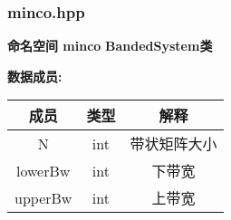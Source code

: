 \subsubsection{minco.hpp}
\textbf{命名空间 minco}
\textbf{BandedSystem类}
\begin{tcolorbox}[red]
        \textbf{数据成员:}\\
        \begin{tabular}{ccc}
            \toprule
            成员 & 类型  & 解释  \\
            \midrule
            N & int & 带状矩阵大小 \\
            lowerBw & int & 下带宽 \\
            upperBw & int & 上带宽 \\
            \bottomrule
        \end{tabular}
\end{tcolorbox}
    
